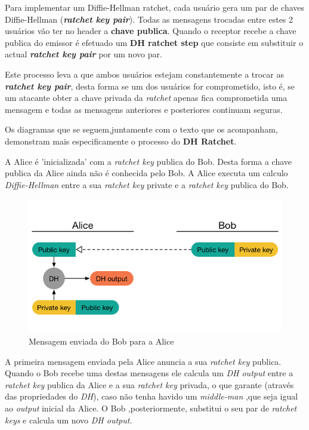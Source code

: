 Para implementar um Diffie-Hellman ratchet, cada usuário gera um par de chaves Diffie-Hellman (\textit{\textbf{ratchet key pair}}). Todas as mensagens trocadas entre estes 2 usuários vão ter no header a \textbf{chave publica}. Quando o receptor recebe a chave publica do emissor é efetuado um \textbf{DH ratchet step} que consiste em substituir o actual \textbf{\textit{ratchet key pair}} por um novo par.

Este processo leva a que ambos usuários estejam constantemente a trocar as \textbf{\textit{ratchet key pair}}, desta forma se um dos usuários for comprometido, isto é, se um atacante obter a chave privada da \textit{ratchet} apenas fica comprometida uma mensagem e todas as mensagens anteriores e posteriores continuam seguras.

Os diagramas que se seguem,juntamente com o texto que os acompanham, demonstram mais especificamente o processo do \textbf{DH Ratchet}.


A Alice é 'inicializada' com a \textit{ratchet key} publica do Bob. Desta forma a chave publica da Alice ainda não é conhecida pelo Bob. A Alice executa um calculo \textit{Diffie-Hellman} entre a sua \textit{ratchet key} private e a \textit{ratchet key} publica do Bob.

\begin{figure}[H]
\begin{center}
\includegraphics[width=12cm]{img/DH1.png}
\caption{Mensagem enviada do Bob para a Alice}
\label{diagram:DH1}
\centering
\end{center}
\end{figure}

A primeira mensagem enviada pela Alice anuncia a sua \textit{ratchet key} publica. Quando o Bob recebe uma destas mensagens ele calcula um \textit{DH output} entre a \textit{ratchet key} publica da Alice e a sua \textit{ratchet key} privada, o que garante (através das propriedades do \textit{DH}), caso não tenha havido um \textit{middle-man} ,que seja igual ao \textit{output} inicial da Alice. O Bob ,posteriormente, substitui o seu par de \textit{ratchet keys} e calcula um novo \textit{DH output}.

